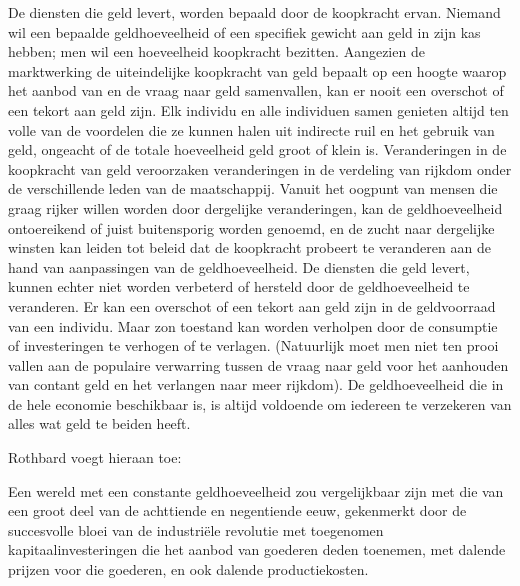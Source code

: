 \begin{blockquotebox}
    De diensten die geld levert, worden bepaald door de koopkracht ervan. Niemand wil een bepaalde geldhoeveelheid of een specifiek gewicht aan geld in zijn kas hebben; men wil een hoeveelheid koopkracht bezitten. Aangezien de marktwerking de uiteindelijke koopkracht van geld bepaalt op een hoogte waarop het aanbod van en de vraag naar geld samenvallen, kan er nooit een overschot of een tekort aan geld zijn. Elk individu en alle individuen samen genieten altijd ten volle van de voordelen die ze kunnen halen uit indirecte ruil en het gebruik van geld, ongeacht of de totale hoeveelheid geld groot of klein is. Veranderingen in de koopkracht van geld veroorzaken veranderingen in de verdeling van rijkdom onder de verschillende leden van de maatschappij. Vanuit het oogpunt van mensen die graag rijker willen worden door dergelijke veranderingen, kan de geldhoeveelheid ontoereikend of juist buitensporig worden genoemd, en de zucht naar dergelijke winsten kan leiden tot beleid dat de koopkracht probeert te veranderen aan de hand van aanpassingen van de geldhoeveelheid. De diensten die geld levert, kunnen echter niet worden verbeterd of hersteld door de geldhoeveelheid te veranderen. Er kan een overschot of een tekort aan geld zijn in de geldvoorraad van een individu. Maar zo\textquotesingle n toestand kan worden verholpen door de consumptie of investeringen te verhogen of te verlagen. (Natuurlijk moet men niet ten prooi vallen aan de populaire verwarring tussen de vraag naar geld voor het aanhouden van contant geld en het verlangen naar meer rijkdom). De geldhoeveelheid die in de hele economie beschikbaar is, is altijd voldoende om iedereen te verzekeren van alles wat geld te beiden heeft.\footnotemark
\end{blockquotebox}

Rothbard voegt hieraan toe:

\begin{blockquotebox}
    Een wereld met een constante geldhoeveelheid zou vergelijkbaar zijn met die van een groot deel van de achttiende en negentiende eeuw, gekenmerkt door de succesvolle bloei van de industriële revolutie met toegenomen kapitaalinvesteringen die het aanbod van goederen deden toenemen, met dalende prijzen voor die goederen, en ook dalende productiekosten.\footnotemark
\end{blockquotebox}

